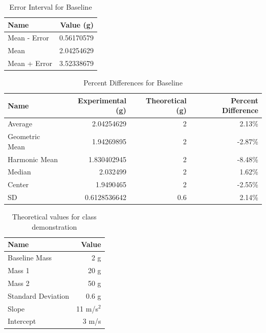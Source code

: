 \begin{table} \label{table.baseline.interval}
    \centering
	\begin{tabular}{|l|r|} \hline
		\textbf{Name} & \textbf{Value (g)} \\
		\hline
		Mean - Error & 0.56170579 \\
		Mean & 2.04254629 \\
		Mean + Error & 3.52338679 \\
		\hline
	\end{tabular}
	\caption{Error Interval for Baseline}
\end{table}
\begin{table} \label{table.baseline.percent}
    \centering
	\begin{tabular}{|l|r|r|r|} \hline
		\textbf{Name} & \textbf{Experimental (g)} & \textbf{Theoretical (g)} & \textbf{Percent Difference} \\
		\hline
        Average & 2.04254629 & 2 & 2.13\% \\
        Geometric Mean & 1.94269895 & 2 & -2.87\% \\
        Harmonic Mean & 1.830402945 & 2 & -8.48\% \\
        Median & 2.032499 & 2 & 1.62\% \\
        Center & 1.9490465 & 2 & -2.55\% \\
        \hline
        SD & 0.6128536642 & 0.6 & 2.14\% \\
		\hline
	\end{tabular}
	\caption{Percent Differences for Baseline}
\end{table}
\begin{table} \label{table.theoretical.demo}
    \centering
    \begin{tabular}{|l|r|}
        \hline
        \textbf{Name} & \textbf{Value} \\
        \hline
        Baseline Mass & 2 g \\
        Mass 1 & 20 g \\
        Mass 2 & 50 g \\
        Standard Deviation & 0.6 g \\
        \hline
        Slope & 11 m/s$^{2}$ \\
        Intercept & 3 m/s \\
        \hline
    \end{tabular}
    \caption{Theoretical values for class demonstration}
\end{table}
